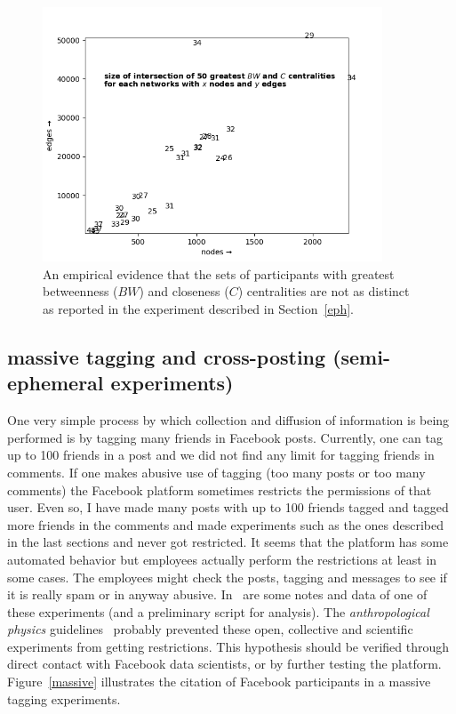 \documentclass[a4paper]{article}
\begin{document}
\begin{figure}[H]
  \centering
    \includegraphics[width=0.9\textwidth]{netHip}
  \caption{An empirical evidence that the sets of participants with greatest betweenness ($BW$) and closeness ($C$) centralities are not as distinct as reported in the experiment described in Section~\ref{eph}.}\label{nh}
\end{figure}

\subsection{massive tagging and cross-posting (semi-ephemeral experiments)}\label{mass}
One very simple process by which collection and diffusion of information is being performed
is by tagging many friends in Facebook posts.
Currently, one can tag up to 100 friends in a post
and we did not find any limit for tagging friends in comments.
If one makes abusive use of tagging (too many posts or too many comments)
the Facebook platform sometimes restricts the permissions of that user.
Even so, I have made many posts with up to 100 friends tagged and tagged more
friends in the comments and made experiments such as the ones described in the
last sections and never got restricted.
It seems that the platform has some automated behavior but employees actually
perform the restrictions at least in some cases.
The employees might check the posts, tagging and messages to see if it is
really spam or in anyway abusive.
In~\cite{anExp} are some notes and data of one of these experiments (and a preliminary script for analysis).
The \emph{anthropological physics} guidelines~\cite{anPhy,anPhy2} probably prevented
these open, collective and scientific experiments from getting restrictions.
This hypothesis should be verified through direct contact with Facebook data scientists,
or by further testing the platform.
Figure~\ref{massive} illustrates the citation of Facebook participants in a massive tagging experiments.
\end{document}
